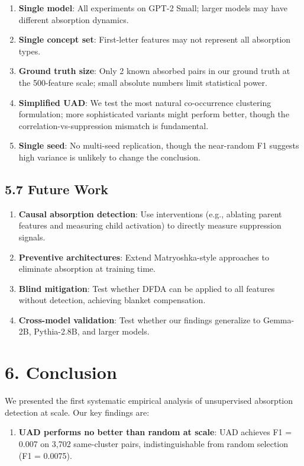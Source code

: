 \documentclass{article}
\begin{document}
\begin{enumerate}
  \item \textbf{Single model}: All experiments on GPT-2 Small; larger models may have different absorption dynamics.
  \item \textbf{Single concept set}: First-letter features may not represent all absorption types.
  \item \textbf{Ground truth size}: Only 2 known absorbed pairs in our ground truth at the 500-feature scale; small absolute numbers limit statistical power.
  \item \textbf{Simplified UAD}: We test the most natural co-occurrence clustering formulation; more sophisticated variants might perform better, though the correlation-vs-suppression mismatch is fundamental.
  \item \textbf{Single seed}: No multi-seed replication, though the near-random F1 suggests high variance is unlikely to change the conclusion.
\end{enumerate}

\subsection{5.7 Future Work}

\begin{enumerate}
  \item \textbf{Causal absorption detection}: Use interventions (e.g., ablating parent features and measuring child activation) to directly measure suppression signals.
  \item \textbf{Preventive architectures}: Extend Matryoshka-style approaches to eliminate absorption at training time.
  \item \textbf{Blind mitigation}: Test whether DFDA can be applied to all features without detection, achieving blanket compensation.
  \item \textbf{Cross-model validation}: Test whether our findings generalize to Gemma-2B, Pythia-2.8B, and larger models.
\end{enumerate}


\section{6. Conclusion}

We presented the first systematic empirical analysis of unsupervised absorption detection at scale. Our key findings are:

\begin{enumerate}
  \item \textbf{UAD performs no better than random at scale}: UAD achieves F1 = 0.007 on 3,702 same-cluster pairs, indistinguishable from random selection (F1 = 0.0075).
\end{enumerate}
\end{document}
